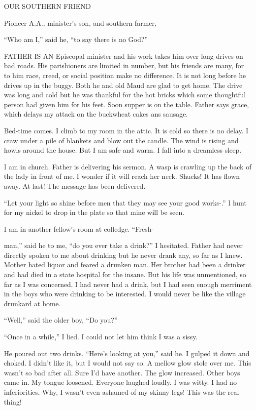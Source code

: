 
OUR SOUTHERN FRIEND

Pioneer A.A., minister’s son, and southern farmer,

“Who am I,” said he, “to say there is no God?”

      FATHER IS AN Episcopal minister and his work takes him over long drives on bad roads. His parishioners are limited in number, but his friends are many, for to him race, creed, or social position make no difference. It is not long before he drives up in the buggy. Both he and old Maud are glad to get home. The drive was long and cold but he was thankful for the hot bricks which some thoughtful person had given him for his feet. Soon supper is on the table. Father says grace, which delays my attack on the buckwheat cakes ans sausage.

Bed-time comes. I climb to my room in the attic. It is cold so there is no delay. I craw under a pile of blankets and blow out the candle. The wind is rising and howls around the house. But I am safe and warm. I fall into a dreamless sleep.

I am in church. Father is delivering his sermon. A wasp is crawling up the back of the lady in front of me. I wonder if it will reach her neck. Shucks! It has flown away. At last! The message has been delivered.

“Let your light so shine before men that they may see your good works-.” I hunt for my nickel to drop in the plate so that mine will be seen.

I am in another fellow’s room at colledge. “Fresh-

man,” said he to me, “do you ever take a drink?” I hesitated. Father had never directly spoken to me about drinking but he never drank any, so far as I knew. Mother hated liquor and feared a drunken man. Her brother had been a drinker and had died in a state hospital for the insane. But his life was unmentioned, so far as I was concerned. I had never had a drink, but I had seen enough merriment in the boys who were drinking to be interested. I would never be like the village drunkard at home.

“Well,” said the older boy, “Do you?”

“Once in a while,” I lied. I could not let him think I was a sissy.

He poured out two drinks. “Here’s looking at you,” said he. I gulped it down and choked. I didn’t like it, but I would not say so. A mellow glow stole over me. This wasn’t so bad after all. Sure I’d have another. The glow increased. Other boys came in. My tongue loosened. Everyone laughed loudly. I was witty. I had no inferiorities. Why, I wasn’t even ashamed of my skinny legs! This was the real thing!

